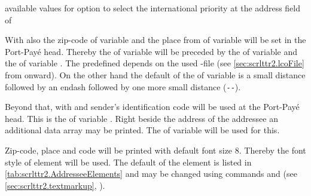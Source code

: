\begin{table}
  \caption[{available values for option  in
    }]{available values for option  to select
    the international priority at the address field of}
  \label{tab:scrlttr2.priority}
  \begin{desctabular}
  \end{desctabular}
\end{table}

With
 also the zip-code of
variable  and the place from  of variable
 will be set in the Port-Pay\'e head. Thereby the
 of variable  will be preceded by the
 of variable  and the 
of variable . The predefined 
depends on the used -file (see \autoref{sec:scrlttr2.lcoFile} from
 onward). On the other hand the default of
the  of variable  is a small
distance followed by an endash followed by one more small distance
(\Macro{,}\texttt{-{}-}\Macro{,}).

Beyond that, with
 and
sender's identification code will be used at the Port-Pay\'e head. This is the
 of variable . Right beside the address of the
addressee an additional data array may be printed. The  of
variable  will be used for this.

%
Zip-code, place and code will be printed
with default font size 8. Thereby the font style of element
 will be used. The default
of the element is listed in \autoref{tab:scrlttr2.AddresseeElements} and may
be changed using commands  and  (see
\autoref{sec:scrlttr2.textmarkup},
).%
%

